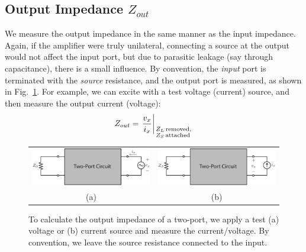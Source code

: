 \subsection{Output Impedance $Z_{out}$}
We measure the output impedance in the same manner as the input impedance.  Again, if the amplifier were truly unilateral, connecting a source at the output would not affect the input port, but due to parasitic leakage (say through capacitance), there is a small influence.  By convention, the \textit{input} port is terminated with the \textit{source} resistance, and the output port is measured, as shown in Fig.~\ref{fig:2port_zout_vx}.
For example, we can excite with a test voltage (current) source, and then measure the output current (voltage):
\begin{equation}
	{Z_{out}} = {\left. {\frac{{{v_x}}}{{{i_x}}}} \right|_{\scriptstyle{Z_L}\,\text{removed},\hfill\atop
	\scriptstyle{Z_S}\,\text{attached}\hfill}}
\end{equation}
\begin{figure}[tb]
\begin{center}
\begin{tabular}{cc}
\includegraphics[width=.5\columnwidth]{2port_zout_vx} &
\includegraphics[width=.5\columnwidth]{2port_zout_ix} \\
(a) & (b) \\
\end{tabular}
\end{center}
\caption{To calculate the output impedance of a two-port, we apply a test (a) voltage or (b) current source and measure the current/voltage.  By convention, we leave the source resistance connected to the input.}
\label{fig:2port_zout_vx}
\end{figure}
